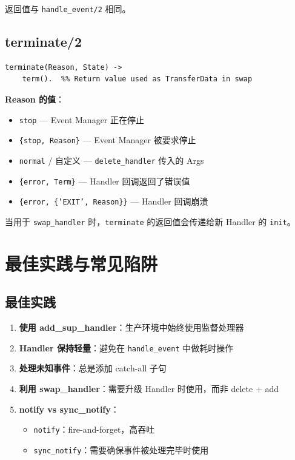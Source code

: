 \documentclass[a4paper,11pt]{article}
\begin{document}
返回值与 \texttt{handle\_event/2} 相同。

\subsection{terminate/2}

\begin{lstlisting}[style=erlangstyle]
terminate(Reason, State) ->
    term().  %% Return value used as TransferData in swap
\end{lstlisting}

\textbf{Reason 的值}：
\begin{itemize}[leftmargin=2em]
    \item \texttt{stop} --- Event Manager 正在停止
    \item \texttt{\{stop, Reason\}} --- Event Manager 被要求停止
    \item \texttt{normal} / 自定义 --- \texttt{delete\_handler} 传入的 Args
    \item \texttt{\{error, Term\}} --- Handler 回调返回了错误值
    \item \texttt{\{error, \{'EXIT', Reason\}\}} --- Handler 回调崩溃
\end{itemize}

\begin{warnbox}[重要]
当用于 \texttt{swap\_handler} 时，\texttt{terminate} 的返回值会传递给新 Handler 的 \texttt{init}。
\end{warnbox}


\section{最佳实践与常见陷阱}

\subsection{最佳实践}

\begin{enumerate}[leftmargin=2em]
    \item \textbf{使用 add\_sup\_handler}：生产环境中始终使用监督处理器
    \item \textbf{Handler 保持轻量}：避免在 \texttt{handle\_event} 中做耗时操作
    \item \textbf{处理未知事件}：总是添加 catch-all 子句
    \item \textbf{利用 swap\_handler}：需要升级 Handler 时使用，而非 delete + add
    \item \textbf{notify vs sync\_notify}：
    \begin{itemize}[leftmargin=1.5em]
        \item \texttt{notify}：fire-and-forget，高吞吐
        \item \texttt{sync\_notify}：需要确保事件被处理完毕时使用
    \end{itemize}
\end{enumerate}
\end{document}
